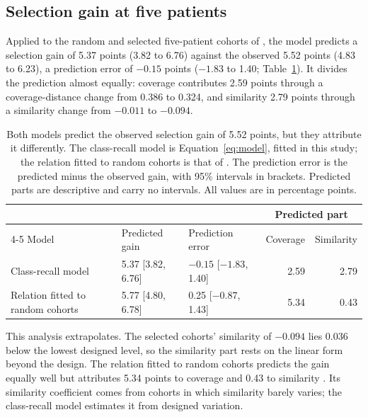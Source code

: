 \subsection{Selection gain at five patients}
\label{sec:secondary-results}
Applied to the random and selected five-patient cohorts of \citet{queisler2026shortageSelection}, the model predicts a selection gain of 5.37 points (3.82 to 6.76) against the observed 5.52 points (4.83 to 6.23), a prediction error of $-0.15$ points ($-1.83$ to 1.40; Table~\ref{tab:selection}). It divides the prediction almost equally: coverage contributes 2.59 points through a coverage-distance change from 0.386 to 0.324, and similarity 2.79 points through a similarity change from $-0.011$ to $-0.094$.

\begin{table}[htbp]
\centering
\small
\renewcommand{\arraystretch}{1.15}
\begin{tabular}{@{}lllrr@{}}
\toprule
 & & & \multicolumn{2}{c}{Predicted part} \\
\cmidrule(l){4-5}
Model & Predicted gain & Prediction error & Coverage & Similarity \\
\midrule
Class-recall model & 5.37 [3.82, 6.76] & $-0.15$ [$-1.83$, 1.40] & 2.59 & 2.79 \\
Relation fitted to random cohorts & 5.77 [4.80, 6.78] & 0.25 [$-0.87$, 1.43] & 5.34 & 0.43 \\
\bottomrule
\end{tabular}
\caption{Both models predict the observed selection gain of 5.52 points, but they attribute it differently. The class-recall model is Equation~\eqref{eq:model}, fitted in this study; the relation fitted to random cohorts is that of \citet{queisler2026shortageSelection}. The prediction error is the predicted minus the observed gain, with 95\% intervals in brackets. Predicted parts are descriptive and carry no intervals. All values are in percentage points.}
\label{tab:selection}
\end{table}

\noindent This analysis extrapolates. The selected cohorts' similarity of $-0.094$ lies 0.036 below the lowest designed level, so the similarity part rests on the linear form beyond the design. The relation fitted to random cohorts predicts the gain equally well but attributes 5.34 points to coverage and 0.43 to similarity \citep{queisler2026shortageSelection}. Its similarity coefficient comes from cohorts in which similarity barely varies; the class-recall model estimates it from designed variation.

